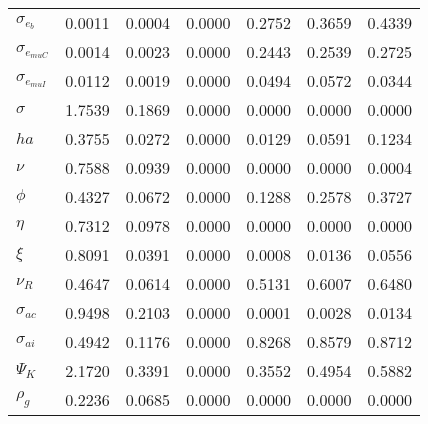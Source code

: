 \begin{center}
\begin{longtable}{lcccccc}
$ \sigma_{{e_b}}       $	 & 	          0.0011	 & 	          0.0004	 & 	          0.0000	 & 	          0.2752	 & 	          0.3659	 & 	          0.4339 \\ 
$ \sigma_{{e_{muC}}}   $	 & 	          0.0014	 & 	          0.0023	 & 	          0.0000	 & 	          0.2443	 & 	          0.2539	 & 	          0.2725 \\ 
$ \sigma_{{e_{muI}}}   $	 & 	          0.0112	 & 	          0.0019	 & 	          0.0000	 & 	          0.0494	 & 	          0.0572	 & 	          0.0344 \\ 
$ {\sigma}             $	 & 	          1.7539	 & 	          0.1869	 & 	          0.0000	 & 	          0.0000	 & 	          0.0000	 & 	          0.0000 \\ 
$ {ha}                 $	 & 	          0.3755	 & 	          0.0272	 & 	          0.0000	 & 	          0.0129	 & 	          0.0591	 & 	          0.1234 \\ 
$ \nu                  $	 & 	          0.7588	 & 	          0.0939	 & 	          0.0000	 & 	          0.0000	 & 	          0.0000	 & 	          0.0004 \\ 
$ {\phi}               $	 & 	          0.4327	 & 	          0.0672	 & 	          0.0000	 & 	          0.1288	 & 	          0.2578	 & 	          0.3727 \\ 
$ {\eta}               $	 & 	          0.7312	 & 	          0.0978	 & 	          0.0000	 & 	          0.0000	 & 	          0.0000	 & 	          0.0000 \\ 
$ \xi                  $	 & 	          0.8091	 & 	          0.0391	 & 	          0.0000	 & 	          0.0008	 & 	          0.0136	 & 	          0.0556 \\ 
$ {\nu_R}              $	 & 	          0.4647	 & 	          0.0614	 & 	          0.0000	 & 	          0.5131	 & 	          0.6007	 & 	          0.6480 \\ 
$ {\sigma_{ac}}        $	 & 	          0.9498	 & 	          0.2103	 & 	          0.0000	 & 	          0.0001	 & 	          0.0028	 & 	          0.0134 \\ 
$ {\sigma_{ai}}        $	 & 	          0.4942	 & 	          0.1176	 & 	          0.0000	 & 	          0.8268	 & 	          0.8579	 & 	          0.8712 \\ 
$ {\Psi_{K}}           $	 & 	          2.1720	 & 	          0.3391	 & 	          0.0000	 & 	          0.3552	 & 	          0.4954	 & 	          0.5882 \\ 
$ {\rho_g}             $	 & 	          0.2236	 & 	          0.0685	 & 	          0.0000	 & 	          0.0000	 & 	          0.0000	 & 	          0.0000 \\ 

\end{longtable}
\end{center}
